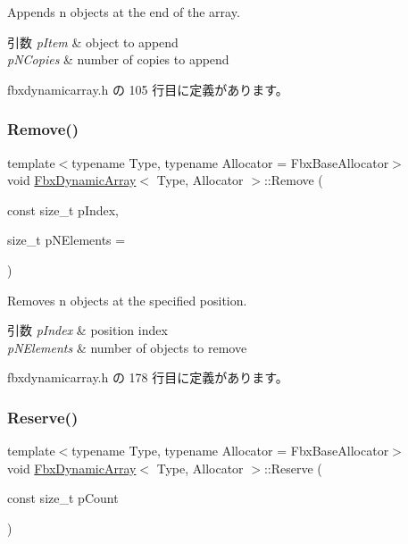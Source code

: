 Appends n objects at the end of the array. 
\begin{DoxyParams}{引数}
{\em p\+Item} & object to append \\
\hline
{\em p\+N\+Copies} & number of copies to append \\
\hline
\end{DoxyParams}


 fbxdynamicarray.\+h の 105 行目に定義があります。

\mbox{\label{class_fbx_dynamic_array_abee89faf5555c293ff4332763b9234ba}} 
\subsubsection{\texorpdfstring{Remove()}{Remove()}}
{\footnotesize\ttfamily template$<$typename Type, typename Allocator = Fbx\+Base\+Allocator$>$ \\
void \hyperlink{class_fbx_dynamic_array}{Fbx\+Dynamic\+Array}$<$ Type, Allocator $>$\+::Remove (\begin{DoxyParamCaption}\item[{const size\+\_\+t}]{p\+Index,  }\item[{size\+\_\+t}]{p\+N\+Elements = {} }\end{DoxyParamCaption})\hspace{0.3cm}{\ttfamily [inline]}}

Removes n objects at the specified position. 
\begin{DoxyParams}{引数}
{\em p\+Index} & position index \\
\hline
{\em p\+N\+Elements} & number of objects to remove \\
\hline
\end{DoxyParams}


 fbxdynamicarray.\+h の 178 行目に定義があります。

\mbox{\label{class_fbx_dynamic_array_a056d5da710401c88f5c92fb5d77c725d}} 
\subsubsection{\texorpdfstring{Reserve()}{Reserve()}}
{\footnotesize\ttfamily template$<$typename Type, typename Allocator = Fbx\+Base\+Allocator$>$ \\
void \hyperlink{class_fbx_dynamic_array}{Fbx\+Dynamic\+Array}$<$ Type, Allocator $>$\+::Reserve (\begin{DoxyParamCaption}\item[{const size\+\_\+t}]{p\+Count }\end{DoxyParamCaption})\hspace{0.3cm}{\ttfamily [inline]}}


